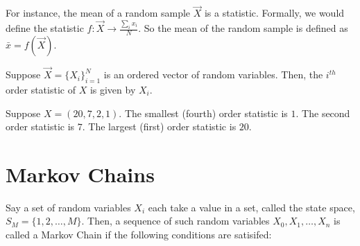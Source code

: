 \begin{example}
For instance, the mean of a random sample $\vec{X}$ is a statistic. Formally, we would define the statistic $f : \vec{X} \to \frac{\sum_i x_i}{N}$. So the mean of the random sample is defined as $\bar{x} = f(\vec{X})$.
\end{example}

\begin{definition}
Suppose $\vec{X} = \{X_i\}_{i = 1}^N$ is an ordered vector of random variables. Then, the $i^{th}$ order statistic of $X$ is given by $X_i$.
\end{definition}

\begin{example}
Suppose $X = (20,7,2,1)$. The smallest (fourth) order statistic is $1$. The second order statistic is $7$. The largest (first) order statistic is $20$.
\end{example}



\newpage
\section{Markov Chains}



\begin{definition} Say a set of random variables $X_i$ each take a value in a set, called the state space, $S_M = \{1,2,\dots,M\}$. Then, a sequence of such random variables $X_0,X_1,\dots,X_n$ is called a Markov Chain if the following conditions are satisifed:
\end{definition}

